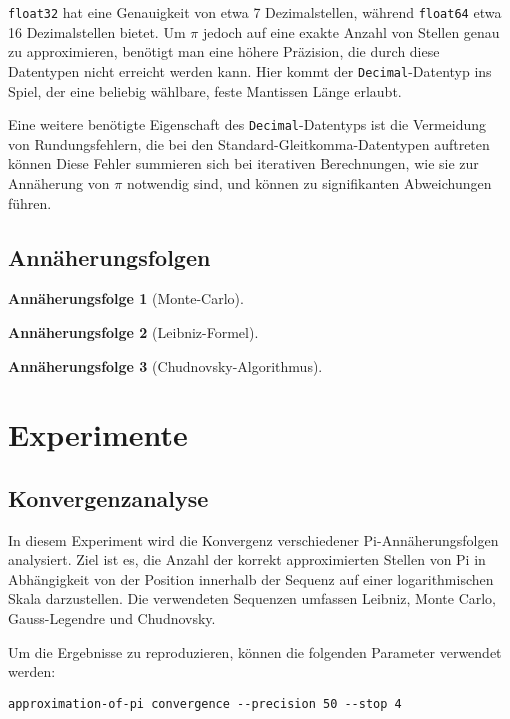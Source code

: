 \documentclass{scrartcl}
\newtheorem{approximation sequence}{Annäherungsfolge}
\begin{document}
\texttt{float32} hat eine Genauigkeit von etwa 7 Dezimalstellen, während \texttt{float64} etwa 16 Dezimalstellen bietet.
Um \(\pi\) jedoch auf eine exakte Anzahl von Stellen genau zu approximieren,
benötigt man eine höhere Präzision, die durch diese Datentypen nicht erreicht
werden kann.
Hier kommt der \texttt{Decimal}-Datentyp ins Spiel, der eine beliebig wählbare,
feste Mantissen Länge erlaubt.

Eine weitere benötigte Eigenschaft des \texttt{Decimal}-Datentyps ist die
Vermeidung von Rundungsfehlern, die bei den Standard-Gleitkomma-Datentypen
auftreten können Diese Fehler summieren sich bei iterativen Berechnungen, wie
sie zur Annäherung von \(\pi\) notwendig sind, und können zu signifikanten
Abweichungen führen.

\subsection{Annäherungsfolgen}

\begin{approximation sequence}[Monte-Carlo]

\end{approximation sequence}

\begin{approximation sequence}[Leibniz-Formel]

\end{approximation sequence}

\begin{approximation sequence}[Chudnovsky-Algorithmus]

\end{approximation sequence}

\section{Experimente}

\subsection{Konvergenzanalyse}

In diesem Experiment wird die Konvergenz verschiedener Pi-Annäherungsfolgen
analysiert. Ziel ist es, die Anzahl der korrekt approximierten Stellen von Pi
in Abhängigkeit von der Position innerhalb der Sequenz auf einer
logarithmischen Skala darzustellen. Die verwendeten Sequenzen umfassen Leibniz,
Monte Carlo, Gauss-Legendre und Chudnovsky.

Um die Ergebnisse zu reproduzieren, können die folgenden Parameter verwendet
werden:
\begin{verbatim}
approximation-of-pi convergence --precision 50 --stop 4
\end{verbatim}
\end{document}
